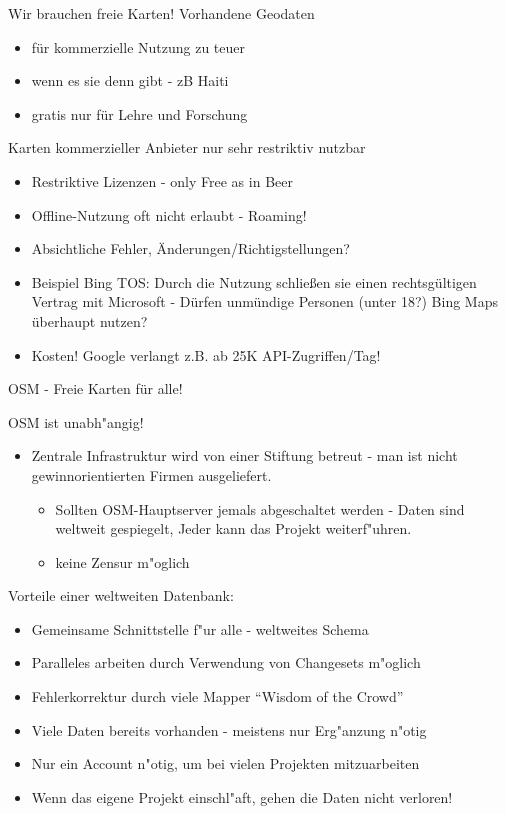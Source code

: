 \documentclass{beamer}
\begin{document}
\begin{frame}{Wir brauchen freie Karten!}
Vorhandene Geodaten 
\begin{itemize}
  \item	für kommerzielle Nutzung zu teuer
  \item	wenn es sie denn gibt - zB Haiti
  \item	gratis nur für Lehre und Forschung
\end{itemize}

\pause
\vspace{2mm}
Karten kommerzieller Anbieter nur sehr restriktiv nutzbar
\begin{itemize}
  \item Restriktive Lizenzen - only Free as in Beer
  \item Offline-Nutzung oft nicht erlaubt - Roaming!
  \item Absichtliche Fehler, Änderungen/Richtigstellungen?
  \pause
  \item Beispiel Bing TOS: Durch die Nutzung schließen sie einen rechtsgültigen Vertrag mit Microsoft - Dürfen unmündige Personen (unter 18?) Bing Maps überhaupt nutzen?
  \item Kosten! Google verlangt z.B. ab 25K API-Zugriffen/Tag!
\end{itemize}

\end{frame}

\begin{frame}{OSM - Freie Karten für alle!}

	OSM ist unabh"angig!
	\begin{itemize}
		\item Zentrale Infrastruktur wird von einer Stiftung betreut - man ist nicht  gewinnorientierten Firmen ausgeliefert.
			\begin{itemize}
				\item 	Sollten OSM-Hauptserver jemals abgeschaltet werden - Daten sind weltweit gespiegelt, Jeder kann das Projekt weiterf"uhren.
				\item keine Zensur m"oglich 
			\end{itemize}
			\pause
	\end{itemize}
	Vorteile einer weltweiten Datenbank:
	\begin{itemize}
		\item	Gemeinsame Schnittstelle f"ur alle - weltweites Schema 
		\item	Paralleles arbeiten durch Verwendung von Changesets m"oglich
		\item 	Fehlerkorrektur durch viele Mapper ``Wisdom of the Crowd''
		\item	Viele Daten bereits vorhanden - meistens nur Erg"anzung n"otig
		\item   Nur ein Account n"otig, um bei vielen Projekten mitzuarbeiten
		\item   Wenn das eigene Projekt einschl"aft, gehen die Daten nicht verloren!
	\end{itemize}



\end{frame}
\end{document}
